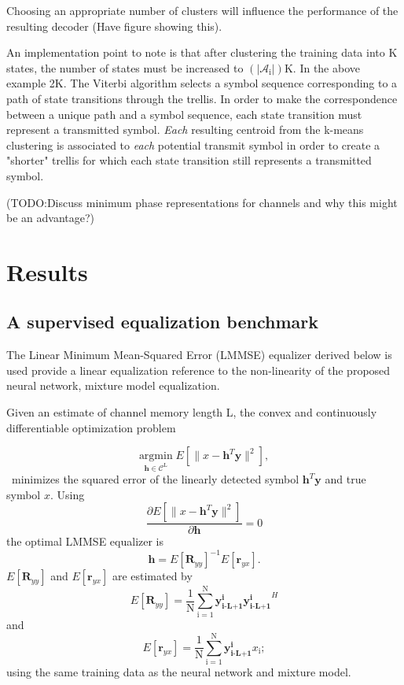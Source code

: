 \documentclass[12pt,a4paper]{report}
\begin{document}
Choosing an appropriate number of clusters will influence the performance of the resulting decoder (Have figure showing this).
\par An implementation point to note is that after clustering the training data into K states, the number of states must be increased to $(|\mathcal{A}_{\mathrm{i}}|)\text{K}$. In the above example 2K. The Viterbi algorithm selects a symbol sequence corresponding to a path of state transitions through the trellis. In order to make the correspondence between a unique path and a symbol sequence, each state transition must represent a transmitted symbol. \emph{Each} resulting centroid from the k-means clustering is associated to \emph{each} potential transmit symbol in order to create a "shorter" trellis for which each state transition still represents a transmitted symbol. 

(TODO:Discuss minimum phase representations for channels and why this might be an advantage?)


\section{Results}
\subsection{A supervised equalization benchmark}
The Linear Minimum Mean-Squared Error (LMMSE) equalizer derived below is used provide a linear equalization reference to the non-linearity of the proposed neural network, mixture model equalization.
\par
Given an estimate of channel memory length L, the convex and continuously differentiable optimization problem 

\begin{equation*}\label{mmse}
\underset{\mathbf{\mathbf{h}} \in \textit{$\mathcal{C}^{\text{L}}$}}{\text{argmin}} \;
 E[\|x-\mathbf{h}^T\mathbf{y}\|^2],
\end{equation*}\
minimizes the squared error of the linearly detected symbol $\mathbf{h}^T\mathbf{y}$ and true symbol $x$.
Using
\begin{equation*}\label{mmse}
\frac{\partial  E[\|x-\mathbf{h}^T\mathbf{y}\|^2]}{\partial \mathbf{h} } = 0
\end{equation*}
the optimal LMMSE equalizer is \cite{proakis1988introduction}
\begin{equation*}\label{mmse}
\mathbf{h} = E[\mathbf{R}_{yy}]^{-1}E[\mathbf{r}_{yx}].
\end{equation*}
$E[\mathbf{R}_{yy}]$ and $E[\mathbf{r}_{yx}]$ are estimated by
\begin{equation*}\label{mmse}
 E[\mathbf{R}_{yy}]= \frac{1}{\mathrm{N}}\sum_{\mathrm{i=1}}^{\mathrm{N}}
\mathbf{y^{\text{i}}_{\text{i-L+1}}}\mathbf{y^{\text{i}}_{\text{i-L+1}}}^H
 \end{equation*}
 and
\begin{equation*}\label{mmse}
E[\mathbf{r}_{yx}]= \frac{1}{\mathrm{N}}\sum_{\mathrm{i=1}}^{\mathrm{N}}
\mathbf{y^{\text{i}}_{\text{i-L+1}}}x_{\text{i}}
;
 \end{equation*}
 using the same training data as the neural network and mixture model. 
\end{document}

